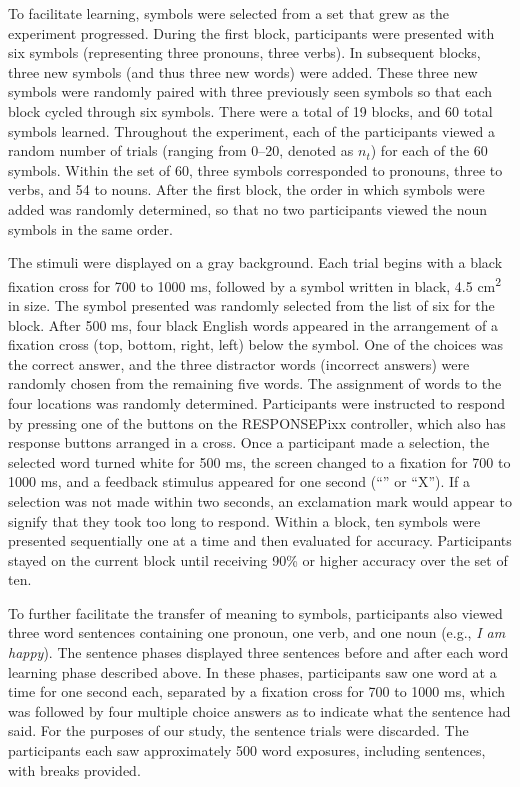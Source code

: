 To facilitate learning, symbols were selected from a set that grew as the experiment progressed. During the first block, participants were presented with six symbols (representing three pronouns, three verbs). In subsequent blocks, three new symbols (and thus three new words) were added. These three new symbols were randomly paired with three previously seen symbols so that each block cycled through six symbols. There were a total of 19 blocks, and 60 total symbols learned. Throughout the experiment, each of the participants viewed a random number of trials (ranging from 0--20, denoted as $n_t$) for each of the 60 symbols. Within the set of 60, three symbols corresponded to pronouns, three to verbs, and 54 to nouns. After the first block, the order in which symbols were added was randomly determined, so that no two participants viewed the noun symbols in the same order.
  
The stimuli were displayed on a gray background.  Each trial begins with a black fixation cross for 700 to 1000 ms, followed by a symbol written in black, 4.5 cm\textsuperscript{2} in size. The symbol presented was randomly selected from the list of six for the block. After 500 ms, four black English words appeared in the arrangement of a fixation cross (top, bottom, right, left) below the symbol. One of the choices was the correct answer, and the three distractor words (incorrect answers) were randomly chosen from the remaining five words. The assignment of words to the four locations was randomly determined. Participants were instructed to respond by pressing one of the buttons on the RESPONSEPixx controller, which also has response buttons arranged in a cross. Once a participant made a selection, the selected word turned white for 500 ms, the screen changed to a fixation for 700 to 1000 ms, and a feedback stimulus appeared for one second (``\CheckmarkBold'' or ``X''). If a selection was not made within two seconds, an exclamation mark would appear to signify that they took too long to respond. Within a block, ten symbols were presented sequentially one at a time and then evaluated for accuracy. Participants stayed on the current block until receiving 90\% or higher accuracy over the set of ten.
  
To further facilitate the transfer of meaning to symbols, participants also viewed three word sentences containing one pronoun, one verb, and one noun (e.g., \emph{I am happy}). The sentence phases displayed three sentences before and after each word learning phase described above. In these phases, participants saw one word at a time for one second each, separated by a fixation cross for 700 to 1000 ms, which was followed by four multiple choice answers as to indicate what the sentence had said. For the purposes of our study, the sentence trials were discarded. The participants each saw approximately 500 word exposures, including sentences, with breaks provided.
